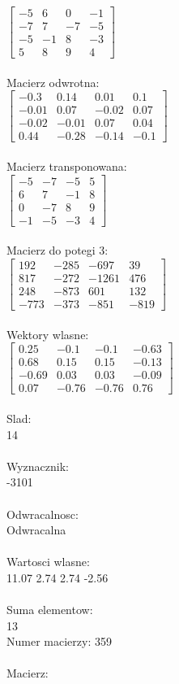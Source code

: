 \documentclass[a4paper,12pt]{article}
\begin{document}
$\begin{bmatrix} -5&6&0&-1\\-7&7&-7&-5\\-5&-1&8&-3\\5&8&9&4 \end{bmatrix}$
\\
\\
Macierz odwrotna:\\

$\begin{bmatrix} -0.3&0.14&0.01&0.1\\-0.01&0.07&-0.02&0.07\\-0.02&-0.01&0.07&0.04\\0.44&-0.28&-0.14&-0.1 \end{bmatrix}$
\\
\\
Macierz transponowana:\\

$\begin{bmatrix} -5&-7&-5&5\\6&7&-1&8\\0&-7&8&9\\-1&-5&-3&4 \end{bmatrix}$
\\
\\
Macierz do potegi 3:\\

$\begin{bmatrix} 192&-285&-697&39\\817&-272&-1261&476\\248&-873&601&132\\-773&-373&-851&-819 \end{bmatrix}$
\\
\\
Wektory wlasne:\\

$\begin{bmatrix} 0.25&-0.1&-0.1&-0.63\\0.68&0.15&0.15&-0.13\\-0.69&0.03&0.03&-0.09\\0.07&-0.76&-0.76&0.76 \end{bmatrix}$
\\
\\
Slad:\\
14
\\
\\
Wyznacznik:\\
-3101
\\
\\
Odwracalnosc:\\
Odwracalna
\\
\\
Wartosci wlasne:\\
11.07 2.74 2.74 -2.56
\\
\\
Suma elementow:\\
13
\\
\newpage
Numer macierzy:
359
\\
\\
Macierz:\\
\end{document}
